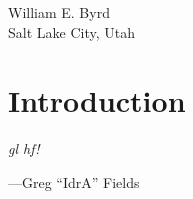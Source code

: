 
\wspace

\noindent
William E. Byrd\\
\noindent
Salt Lake City, Utah\\
\noindent
\monthyear




\chapter{Introduction}

\vspace{-1.5cm}
\begin{fullwidth}
\begin{flushright}
\Large
\textit{gl hf!}

\wspace

---Greg ``IdrA'' Fields
\normalsize
\end{flushright}
\end{fullwidth}

